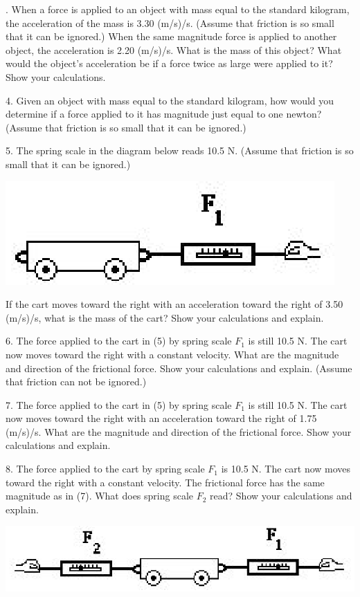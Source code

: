 . When a force is applied to an object with mass equal to the standard kilogram,
the acceleration of the mass is 3.30 (m/s)/s. (Assume that friction is so small
that it can be ignored.) When the same magnitude force is applied to another
object, the acceleration is 2.20 (m/s)/s. What is the mass of this object? What
would the object's acceleration be if a force twice as large were applied to
it? Show your calculations.
\answerspace{20mm}

4. Given an object with mass equal to the standard kilogram, how would you determine
if a force applied to it has magnitude just equal to one newton? (Assume that
friction is so small that it can be ignored.)
\answerspace{20mm}

5. The spring scale in the diagram below reads 10.5 N. (Assume that friction
is so small that it can be ignored.)

{\par\centering \includegraphics{combining/combining_fig2.eps} \par}

If the cart moves toward the right with an acceleration toward the right of
3.50 (m/s)/s, what is the mass of the cart? Show your calculations and explain.
\answerspace{20mm}

6. The force applied to the cart in (5) by spring scale \( F_{1} \) is still
10.5 N. The cart now moves toward the right with a constant velocity. What are
the magnitude and direction of the frictional force. Show your calculations
and explain. (Assume that friction can not be ignored.)
\answerspace{20mm}

7. The force applied to the cart in (5) by spring scale \( F_{1} \) is still
10.5 N. The cart now moves toward the right with an acceleration toward the
right of 1.75 (m/s)/s. What are the magnitude and direction of the frictional
force. Show your calculations and explain.
\answerspace{20mm}

8. The force applied to the cart by spring scale \( F_{1} \) is 10.5 N.
The cart now moves toward the right with a constant velocity. The frictional
force has the same magnitude as in (7). What does spring scale \( F_{2} \)
read? Show your calculations and explain.

\includegraphics{combining/combining_fig4.eps}

